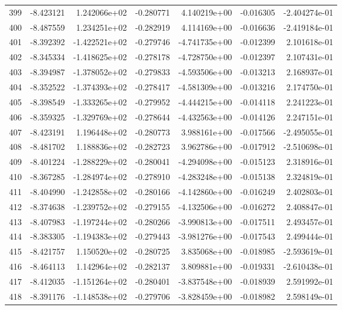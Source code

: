 \begin{tabular}{rrrrrrr}
 399 &  -8.423121 &  1.242066e+02 & -0.280771 &  4.140219e+00 &   -0.016305 & -2.404274e-01 \\
 400 &  -8.487559 &  1.234251e+02 & -0.282919 &  4.114169e+00 &   -0.016636 & -2.419184e-01 \\
 401 &  -8.392392 & -1.422521e+02 & -0.279746 & -4.741735e+00 &   -0.012399 &  2.101618e-01 \\
 402 &  -8.345334 & -1.418625e+02 & -0.278178 & -4.728750e+00 &   -0.012397 &  2.107431e-01 \\
 403 &  -8.394987 & -1.378052e+02 & -0.279833 & -4.593506e+00 &   -0.013213 &  2.168937e-01 \\
 404 &  -8.352522 & -1.374393e+02 & -0.278417 & -4.581309e+00 &   -0.013216 &  2.174750e-01 \\
 405 &  -8.398549 & -1.333265e+02 & -0.279952 & -4.444215e+00 &   -0.014118 &  2.241223e-01 \\
 406 &  -8.359325 & -1.329769e+02 & -0.278644 & -4.432563e+00 &   -0.014126 &  2.247151e-01 \\
 407 &  -8.423191 &  1.196448e+02 & -0.280773 &  3.988161e+00 &   -0.017566 & -2.495055e-01 \\
 408 &  -8.481702 &  1.188836e+02 & -0.282723 &  3.962786e+00 &   -0.017912 & -2.510698e-01 \\
 409 &  -8.401224 & -1.288229e+02 & -0.280041 & -4.294098e+00 &   -0.015123 &  2.318916e-01 \\
 410 &  -8.367285 & -1.284974e+02 & -0.278910 & -4.283248e+00 &   -0.015138 &  2.324819e-01 \\
 411 &  -8.404990 & -1.242858e+02 & -0.280166 & -4.142860e+00 &   -0.016249 &  2.402803e-01 \\
 412 &  -8.374638 & -1.239752e+02 & -0.279155 & -4.132506e+00 &   -0.016272 &  2.408847e-01 \\
 413 &  -8.407983 & -1.197244e+02 & -0.280266 & -3.990813e+00 &   -0.017511 &  2.493457e-01 \\
 414 &  -8.383305 & -1.194383e+02 & -0.279443 & -3.981276e+00 &   -0.017543 &  2.499444e-01 \\
 415 &  -8.421757 &  1.150520e+02 & -0.280725 &  3.835068e+00 &   -0.018985 & -2.593619e-01 \\
 416 &  -8.464113 &  1.142964e+02 & -0.282137 &  3.809881e+00 &   -0.019331 & -2.610438e-01 \\
 417 &  -8.412035 & -1.151264e+02 & -0.280401 & -3.837548e+00 &   -0.018939 &  2.591992e-01 \\
 418 &  -8.391176 & -1.148538e+02 & -0.279706 & -3.828459e+00 &   -0.018982 &  2.598149e-01 \\

\end{tabular}
